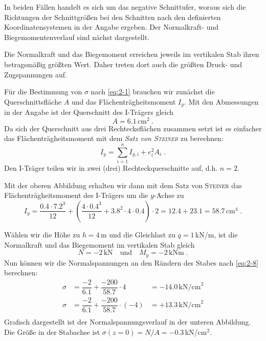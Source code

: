 \begin{example}
	In beiden Fällen handelt es sich um das negative Schnittufer, woraus sich die Richtungen der Schnittgrößen bei den Schnitten nach den definierten Koordinatensystemen in der Angabe ergeben.
	Der Normalkraft- und Biegemomentenverlauf sind nächst dargestellt. 
	\begin{center}
		
	\end{center}
	Die Normalkraft und das Biegemoment erreichen jeweils im vertikalen Stab ihren betragsmäßig größten Wert.
	Daher treten dort auch die größten Druck- und Zugspannungen auf.
	
	Für die Bestimmung von $\sigma$ nach \eqref{eq:2-1} brauchen wir zunächst die Querschnittsfläche $A$ und das Flächenträgheitsmoment $I_y$.
	Mit den Abmessungen in der Angabe ist der Querschnitt des I-Trägers gleich
	\[A = 6.1\,\text{cm}^2 \; .\]
	Da sich der Querschnitt aus drei Rechtecksflächen zusammen setzt ist es einfacher das Flächenträgheitsmoment mit dem \emph{Satz von \textsc{Steiner}} zu berechnen:
	\[
	I_y = \sum\limits_{i=1}^n I_{\overline{y},i} + e_i^2A_i \; .
	\]
	Den I-Träger teilen wir in zwei (drei) Rechteckquerschnitte auf, d.h. $n=2$.
	\begin{center}
		
	\end{center}
	Mit der oberen Abbildung erhalten wir dann mit dem Satz von \textsc{Steiner} das Flächenträgheitsmoment des I-Trägers um die $y$-Achse zu
	\[
	I_y = \dfrac{0.4\cdot 7.2^3}{12} + \left(\dfrac{4\cdot 0.4^3}{12} + 3.8^2\cdot 4 \cdot 0.4\right)\cdot 2 = 12.4 + 23.1 = 58.7\,\text{cm}^4 \; .
	\]
	
	Wählen wir die Höhe zu $h=4\,$m und die Gleichlast zu $q=1\,$kN/m, ist die Normalkraft und das Biegemoment im vertikalen Stab gleich
	\[
	N = - 2\,\text{kN} \quad \text{und} \quad M_y = -2\,\text{kNm} \; .
	\]
	Nun können wir die Normalspannungen an den Rändern des Stabes nach \eqref{eq:2-8} berechnen:
	\[
	\begin{aligned}
	\sigma&=\dfrac{-2}{6.1}+\dfrac{-200}{58.7}\cdot 4 &= -14.0\,\text{kN/cm}^2 \\
	\sigma&=\dfrac{-2}{6.1}+\dfrac{-200}{58.7}\cdot (-4) &= +13.3\,\text{kN/cm}^2  \\
	\end{aligned}
	\]
	Grafisch dargestellt ist der Normalspannungsverlauf in der unteren Abbildung.
	Die Größe in der Stabachse ist $\sigma(z=0)=N/A=-0.3\,$kN/cm$^2$.
	\begin{center}
		
	\end{center}

\end{example}




